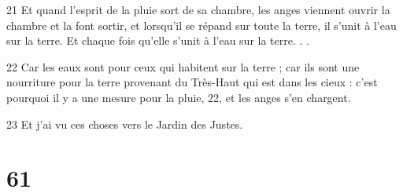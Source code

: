 \par 21 Et quand l'esprit de la pluie sort de sa chambre, les anges viennent ouvrir la chambre et la font sortir, et lorsqu'il se répand sur toute la terre, il s'unit à l'eau sur la terre. Et chaque fois qu'elle s'unit à l'eau sur la terre. . .
\par 22 Car les eaux sont pour ceux qui habitent sur la terre ; car ils sont une nourriture pour la terre provenant du Très-Haut qui est dans les cieux : c'est pourquoi il y a une mesure pour la pluie, 22, et les anges s'en chargent.
\par 23 Et j'ai vu ces choses vers le Jardin des Justes.

\chapter{61}

